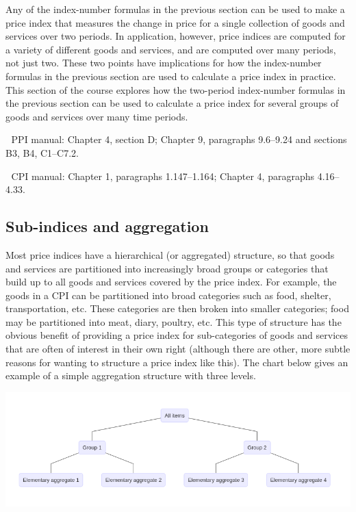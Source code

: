 \documentclass[]{article}
\begin{document}
Any of the index-number formulas in the previous section can be used to make a price index that measures the change in price for a single collection of goods and services over two periods. In application, however, price indices are computed for a variety of different goods and services, and are computed over many periods, not just two. These two points have implications for how the index-number formulas in the previous section are used to calculate a price index in practice. This section of the course explores how the two-period index-number formulas in the previous section can be used to calculate a price index for several groups of goods and services over many time periods.

📖 PPI manual: Chapter 4, section D; Chapter 9, paragraphs 9.6--9.24 and sections B3, B4, C1--C7.2.

📖 CPI manual: Chapter 1, paragraphs 1.147--1.164; Chapter 4, paragraphs 4.16--4.33.

\hypertarget{sub-indices-and-aggregation}{%
\subsection{Sub-indices and aggregation}\label{sub-indices-and-aggregation}}

Most price indices have a hierarchical (or aggregated) structure, so that goods and services are partitioned into increasingly broad groups or categories that build up to all goods and services covered by the price index. For example, the goods in a CPI can be partitioned into broad categories such as food, shelter, transportation, etc. These categories are then broken into smaller categories; food may be partitioned into meat, diary, poultry, etc. This type of structure has the obvious benefit of providing a price index for sub-categories of goods and services that are often of interest in their own right (although there are other, more subtle reasons for wanting to structure a price index like this). The chart below gives an example of a simple aggregation structure with three levels.

\includegraphics{img/plot1.png}
\end{document}
